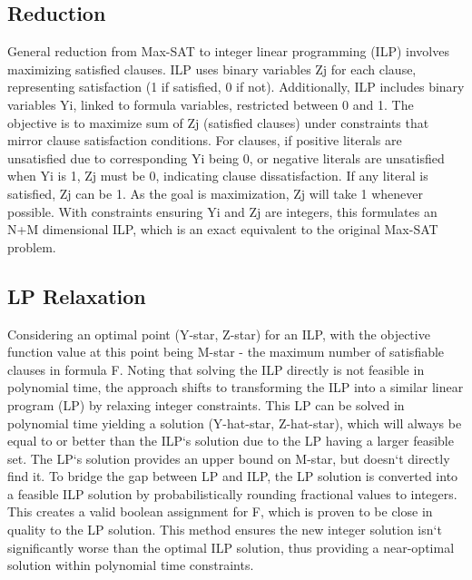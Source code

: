 \subsection*{Reduction}
General reduction from Max-SAT to integer linear programming (ILP) involves maximizing satisfied clauses.
ILP uses binary variables Zj for each clause, representing satisfaction (1 if satisfied, 0 if not).
Additionally, ILP includes binary variables Yi, linked to formula variables, restricted between 0 and 1.
The objective is to maximize sum of Zj (satisfied clauses) under constraints that mirror clause satisfaction conditions.
For clauses, if positive literals are unsatisfied due to corresponding Yi being 0, or negative literals are unsatisfied when Yi is 1, Zj must be 0, indicating clause dissatisfaction.
If any literal is satisfied, Zj can be 1.
As the goal is maximization, Zj will take 1 whenever possible.
With constraints ensuring Yi and Zj are integers, this formulates an N+M dimensional ILP, which is an exact equivalent to the original Max-SAT problem.

\subsection*{LP Relaxation}
Considering an optimal point (Y-star, Z-star) for an ILP, with the objective function value at this point being M-star - the maximum number of satisfiable clauses in formula F\@.
Noting that solving the ILP directly is not feasible in polynomial time, the approach shifts to transforming the ILP into a similar linear program (LP) by relaxing integer constraints.
This LP can be solved in polynomial time yielding a solution (Y-hat-star, Z-hat-star), which will always be equal to or better than the ILP`s solution due to the LP having a larger feasible set.
The LP`s solution provides an upper bound on M-star, but doesn`t directly find it.
To bridge the gap between LP and ILP, the LP solution is converted into a feasible ILP solution by probabilistically rounding fractional values to integers.
This creates a valid boolean assignment for F, which is proven to be close in quality to the LP solution.
This method ensures the new integer solution isn`t significantly worse than the optimal ILP solution, thus providing a near-optimal solution within polynomial time constraints.

